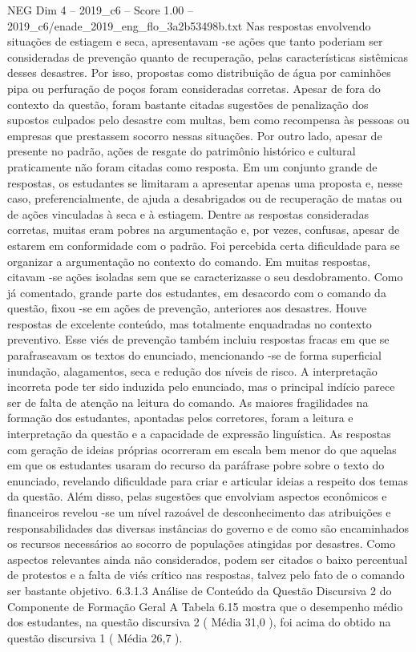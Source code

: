 \begin{textsample}{NEG Dim 4 – 2019\_c6 – Score 1.00 – 2019\_c6/enade\_2019\_eng\_flo\_3a2b53498b.txt}
Nas respostas envolvendo situações de estiagem e seca, apresentavam -se ações que tanto poderiam ser consideradas de prevenção quanto de recuperação, pelas características sistêmicas desses desastres.
Por isso, propostas como distribuição de água por caminhões pipa ou perfuração de poços foram consideradas corretas.
Apesar de fora do contexto da questão, foram bastante citadas sugestões de penalização dos supostos culpados pelo desastre com multas, bem como recompensa às pessoas ou empresas que prestassem socorro nessas situações.
Por outro lado, apesar de presente no padrão, ações de resgate do patrimônio histórico e cultural praticamente não foram citadas como resposta.
Em um conjunto grande de respostas, os estudantes se limitaram a apresentar apenas uma proposta e, nesse caso, preferencialmente, de ajuda a desabrigados ou de recuperação de matas ou de ações vinculadas à seca e à estiagem.
Dentre as respostas consideradas corretas, muitas eram pobres na argumentação e, por vezes, confusas, apesar de estarem em conformidade com o padrão.
Foi percebida certa dificuldade para se organizar a argumentação no contexto do comando.
Em muitas respostas, citavam -se ações isoladas sem que se caracterizasse o seu desdobramento.
Como já comentado, grande parte dos estudantes, em desacordo com o comando da questão, fixou -se em ações de prevenção, anteriores aos desastres.
Houve respostas de excelente conteúdo, mas totalmente enquadradas no contexto preventivo.
Esse viés de prevenção também incluiu respostas fracas em que se parafraseavam os textos do enunciado, mencionando -se de forma superficial inundação, alagamentos, seca e redução dos níveis de risco.
A interpretação incorreta pode ter sido induzida pelo enunciado, mas o principal indício parece ser de falta de atenção na leitura do comando.
As maiores fragilidades na formação dos estudantes, apontadas pelos corretores, foram a leitura e interpretação da questão e a capacidade de expressão linguística.
As respostas com geração de ideias próprias ocorreram em escala bem menor do que aquelas em que os estudantes usaram do recurso da paráfrase pobre sobre o texto do enunciado, revelando dificuldade para criar e articular ideias a respeito dos temas da questão.
Além disso, pelas sugestões que envolviam aspectos econômicos e financeiros revelou -se um nível razoável de desconhecimento das atribuições e responsabilidades das diversas instâncias do governo e de como são encaminhados os recursos necessários ao socorro de populações atingidas por desastres.
Como aspectos relevantes ainda não considerados, podem ser citados o baixo percentual de protestos e a falta de viés crítico nas respostas, talvez pelo fato de o comando ser bastante objetivo. 6.3.1.3 Análise de Conteúdo da Questão Discursiva 2 do Componente de Formação Geral A Tabela 6.15 mostra que o desempenho médio dos estudantes, na questão discursiva 2 ( Média 31,0 ), foi acima do obtido na questão discursiva 1 ( Média 26,7 ).

\end{textsample}
